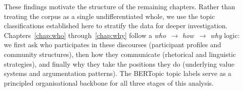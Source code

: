 \documentclass[../CLthesis.tex]{subfiles}
\begin{document}
These findings motivate the structure of the remaining chapters. Rather than treating the corpus as a single undifferentiated whole, we use the topic classifications established here to stratify the data for deeper investigation. Chapters~\ref{chap:who} through~\ref{chap:why} follow a \textit{who~$\rightarrow$ how~$\rightarrow$ why} logic: we first ask who participates in these discourses (participant profiles and community structures), then how they communicate (rhetorical and linguistic strategies), and finally why they take the positions they do (underlying value systems and argumentation patterns). The BERTopic topic labels serve as a principled organisational backbone for all three stages of this analysis.

\subfilebibliography
\end{document}
